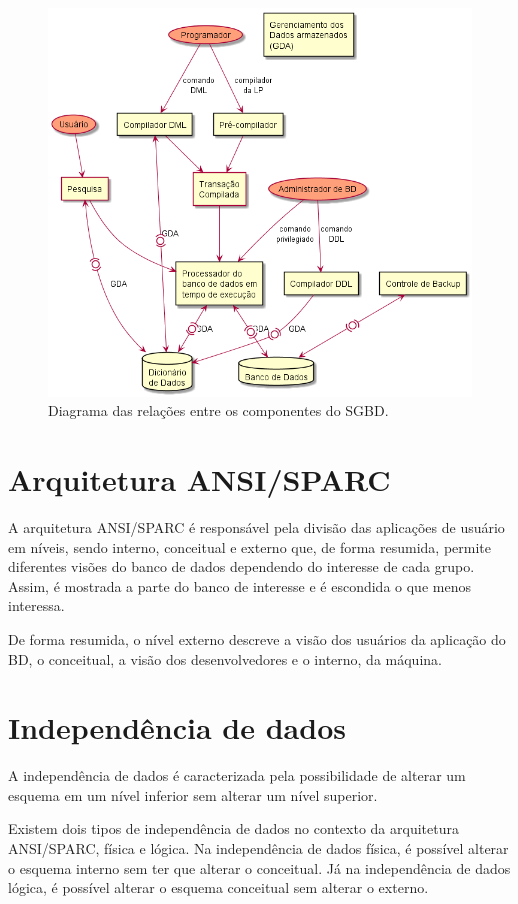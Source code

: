 \documentclass[12pt]{article}
\begin{document}
\begin{figure}[H]
    \centering
    \includegraphics[width=.7\textwidth]{Diagrama18/diagrama18.png}
    \caption{Diagrama das relações entre os componentes do SGBD.}
\end{figure}

\section{Arquitetura ANSI/SPARC}
A arquitetura ANSI/SPARC é responsável pela divisão das aplicações de usuário em níveis, sendo interno, conceitual e externo que, de forma resumida, permite diferentes visões do banco de dados dependendo do interesse de cada grupo. Assim, é mostrada a parte do banco de interesse e é escondida o que menos interessa.

De forma resumida, o nível externo descreve a visão dos usuários da aplicação do BD, o conceitual, a visão dos desenvolvedores e o interno, da máquina.

\section{Independência de dados}
A independência de dados é caracterizada pela possibilidade de alterar um esquema em um nível inferior sem alterar um nível superior.

Existem dois tipos de independência de dados no contexto da arquitetura ANSI/SPARC, física e lógica. Na independência de dados física, é possível alterar o esquema interno sem ter que alterar o conceitual. Já na independência de dados lógica, é possível alterar o esquema conceitual sem alterar o externo.
\end{document}

